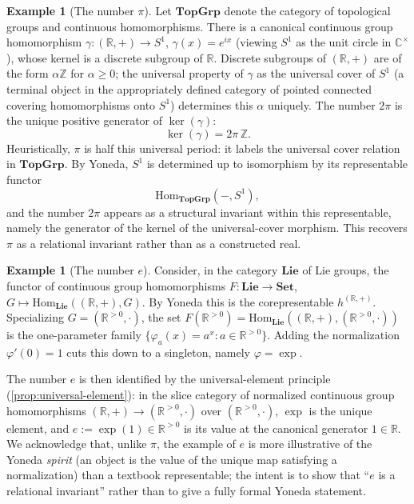 \documentclass[12pt]{article}
\theoremstyle{definition}
\newtheorem{example}[theorem]{Example}
\theoremstyle{remark}
\begin{document}
\begin{example}[The number $\pi$]
\label{ex:pi-yoneda}
Let $\mathbf{TopGrp}$ denote the category of topological groups and continuous homomorphisms. There is a canonical continuous group homomorphism $\gamma\colon (\mathbb{R}, +) \to S^{1}$, $\gamma(x) = e^{ix}$ (viewing $S^{1}$ as the unit circle in $\mathbb{C}^{\times}$), whose kernel is a discrete subgroup of $\mathbb{R}$. Discrete subgroups of $(\mathbb{R}, +)$ are of the form $\alpha \mathbb{Z}$ for $\alpha \ge 0$; the universal property of $\gamma$ as the universal cover of $S^{1}$ (a terminal object in the appropriately defined category of pointed connected covering homomorphisms onto $S^{1}$) determines this $\alpha$ uniquely. The number $2\pi$ is the unique positive generator of $\ker(\gamma)$:
\[
\ker(\gamma) = 2\pi\, \mathbb{Z}.
\]
Heuristically, $\pi$ is half this universal period: it labels the universal cover relation in $\mathbf{TopGrp}$. By Yoneda, $S^{1}$ is determined up to isomorphism by its representable functor
\[
\mathrm{Hom}_{\mathbf{TopGrp}}(-, S^{1}),
\]
and the number $2\pi$ appears as a structural invariant within this representable, namely the generator of the kernel of the universal-cover morphism. This recovers $\pi$ as a relational invariant rather than as a constructed real.
\end{example}

\begin{example}[The number $e$]
\label{ex:e-yoneda}
Consider, in the category $\mathbf{Lie}$ of Lie groups, the functor of continuous group homomorphisms $F\colon \mathbf{Lie} \to \mathbf{Set}$, $G \mapsto \mathrm{Hom}_{\mathbf{Lie}}((\mathbb{R}, +), G)$. By Yoneda this is the corepresentable $h^{(\mathbb{R}, +)}$. Specializing $G = (\mathbb{R}^{>0}, \cdot)$, the set $F(\mathbb{R}^{>0}) = \mathrm{Hom}_{\mathbf{Lie}}((\mathbb{R}, +), (\mathbb{R}^{>0}, \cdot))$ is the one-parameter family $\{\varphi_a(x) = a^x : a \in \mathbb{R}^{>0}\}$. Adding the normalization $\varphi'(0) = 1$ cuts this down to a singleton, namely $\varphi = \exp$.

The number $e$ is then identified by the universal-element principle (\cref{prop:universal-element}): in the slice category of normalized continuous group homomorphisms $(\mathbb{R}, +) \to (\mathbb{R}^{>0}, \cdot)$ over $(\mathbb{R}^{>0}, \cdot)$, $\exp$ is the unique element, and $e := \exp(1) \in \mathbb{R}^{>0}$ is its value at the canonical generator $1 \in \mathbb{R}$. We acknowledge that, unlike $\pi$, the example of $e$ is more illustrative of the Yoneda \emph{spirit} (an object is the value of the unique map satisfying a normalization) than a textbook representable; the intent is to show that ``$e$ is a relational invariant'' rather than to give a fully formal Yoneda statement.
\end{example}
\end{document}

